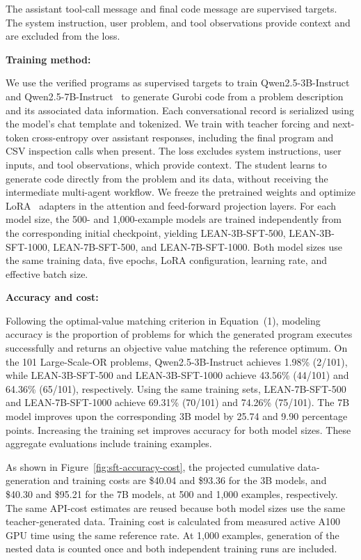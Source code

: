 \documentclass[11pt]{article}
\begin{document}
\begin{enumerate}[label=(AssoE.\arabic*),leftmargin=*]
\begin{enumerate}[label=(R2.Major.\arabic*),leftmargin=*]
The assistant tool-call message and final code message are supervised targets. The system instruction, user problem, and tool observations provide context and are excluded from the loss.

\medskip
\textbf{Training method:}

We use the verified programs as supervised targets to train Qwen2.5-3B-Instruct and Qwen2.5-7B-Instruct~\citep{yang2024qwen25} to generate Gurobi code from a problem description and its associated data information. Each conversational record is serialized using the model's chat template and tokenized. We train with teacher forcing and next-token cross-entropy over assistant responses, including the final program and CSV inspection calls when present. The loss excludes system instructions, user inputs, and tool observations, which provide context. The student learns to generate code directly from the problem and its data, without receiving the intermediate multi-agent workflow. We freeze the pretrained weights and optimize LoRA~\citep{hu2022lora} adapters in the attention and feed-forward projection layers. For each model size, the 500- and 1,000-example models are trained independently from the corresponding initial checkpoint, yielding LEAN-3B-SFT-500, LEAN-3B-SFT-1000, LEAN-7B-SFT-500, and LEAN-7B-SFT-1000. Both model sizes use the same training data, five epochs, LoRA configuration, learning rate, and effective batch size. 

\medskip
\textbf{Accuracy and cost:}

Following the optimal-value matching criterion in Equation~(1), modeling accuracy is the proportion of problems for which the generated program executes successfully and returns an objective value matching the reference optimum. On the 101 Large-Scale-OR problems, Qwen2.5-3B-Instruct achieves 1.98\% (2/101), while LEAN-3B-SFT-500 and LEAN-3B-SFT-1000 achieve 43.56\% (44/101) and 64.36\% (65/101), respectively. Using the same training sets, LEAN-7B-SFT-500 and LEAN-7B-SFT-1000 achieve 69.31\% (70/101) and 74.26\% (75/101). The 7B model improves upon the corresponding 3B model by 25.74 and 9.90 percentage points. Increasing the training set improves accuracy for both model sizes. These aggregate evaluations include training examples.

As shown in Figure~\ref{fig:sft-accuracy-cost}, the projected cumulative data-generation and training costs are \$40.04 and \$93.36 for the 3B models, and \$40.30 and \$95.21 for the 7B models, at 500 and 1,000 examples, respectively. The same API-cost estimates are reused because both model sizes use the same teacher-generated data. Training cost is calculated from measured active A100 GPU time using the same reference rate. At 1,000 examples, generation of the nested data is counted once and both independent training runs are included.


\end{enumerate}
\end{enumerate}
\end{document}
